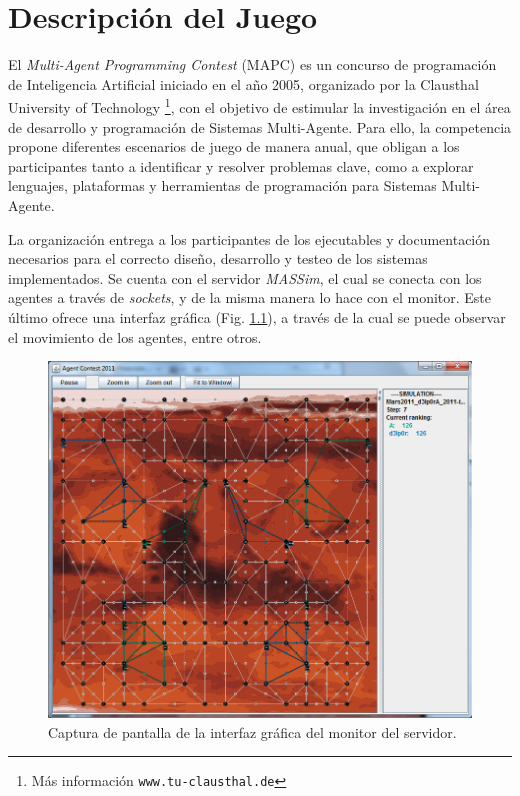 \chapter{Descripción del Juego}

El \textit{Multi-Agent Programming Contest}\cite{BehrensAMAI2010b} (MAPC) es un
concurso de programación de Inteligencia Artificial iniciado en el año 2005, 
organizado por la Clausthal University of Technology 
\footnote{Más información \texttt{www.tu-clausthal.de}}, con el objetivo de 
estimular la investigación en el área de desarrollo y programación de 
Sistemas Multi-Agente. Para ello, la competencia propone diferentes 
escenarios de juego de manera anual, que obligan a los participantes tanto a 
identificar y resolver problemas clave, como a explorar lenguajes, 
plataformas y herramientas de programación para Sistemas Multi-Agente.

La organización entrega a los participantes de los ejecutables y documentación
necesarios para el correcto diseño, desarrollo y testeo de los sistemas 
implementados. Se cuenta con el servidor \textit{MASSim}, el cual se conecta
con los agentes a través de \textit{sockets}, y de la misma manera lo hace con
el monitor. Este último ofrece una interfaz gráfica (Fig. \ref{fig:ssjuego}), 
a través de la cual se puede observar el movimiento de los agentes, entre 
otros.

\begin{figure}
\centering
\includegraphics[width=\textwidth]{ssjuego.png}
\caption{Captura de pantalla de la interfaz gráfica del monitor del servidor.}
\label{fig:ssjuego}
\end{figure}

